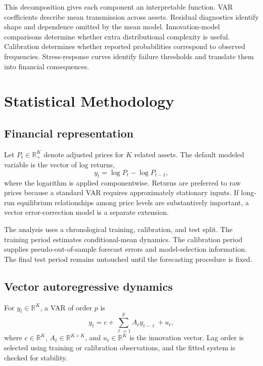 \documentclass[11pt]{article}
\newcommand{\R}{\mathbb{R}}
\begin{document}
This decomposition gives each component an interpretable function. VAR coefficients describe mean transmission across assets. Residual diagnostics identify shape and dependence omitted by the mean model. Innovation-model comparisons determine whether extra distributional complexity is useful. Calibration determines whether reported probabilities correspond to observed frequencies. Stress-response curves identify failure thresholds and translate them into financial consequences.

\section{Statistical Methodology}

\subsection{Financial representation}

Let $P_t\in\R^K_{+}$ denote adjusted prices for $K$ related assets. The default modeled variable is the vector of log returns,
\begin{equation}
    y_t=\log P_t-\log P_{t-1},
\end{equation}
where the logarithm is applied componentwise. Returns are preferred to raw prices because a standard VAR requires approximately stationary inputs. If long-run equilibrium relationships among price levels are substantively important, a vector error-correction model is a separate extension.

The analysis uses a chronological training, calibration, and test split. The training period estimates conditional-mean dynamics. The calibration period supplies pseudo-out-of-sample forecast errors and model-selection information. The final test period remains untouched until the forecasting procedure is fixed.

\subsection{Vector autoregressive dynamics}

For $y_t\in\R^K$, a VAR of order $p$ is
\begin{equation}
    y_t=c+\sum_{\ell=1}^{p}A_{\ell}y_{t-\ell}+u_t,
    \label{eq:var}
\end{equation}
where $c\in\R^K$, $A_{\ell}\in\R^{K\times K}$, and $u_t\in\R^K$ is the innovation vector. Lag order is selected using training or calibration observations, and the fitted system is checked for stability.
\end{document}
